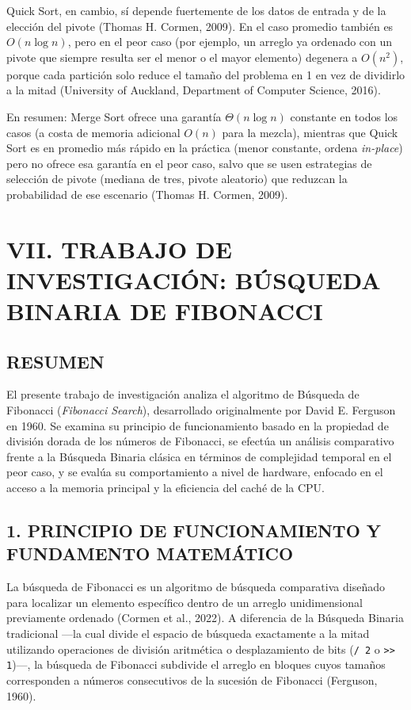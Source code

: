 \documentclass[12pt,a4paper]{article}
\begin{document}
Quick Sort, en cambio, sí depende fuertemente de los datos de entrada y de la elección del pivote
(Thomas H. Cormen, 2009). En el caso promedio también es $O(n \log n)$, pero en el peor caso (por
ejemplo, un arreglo ya ordenado con un pivote que siempre resulta ser el menor o el mayor
elemento) degenera a $O(n^2)$, porque cada partición solo reduce el tamaño del problema en 1 en
vez de dividirlo a la mitad (University of Auckland, Department of Computer Science, 2016).

En resumen: Merge Sort ofrece una garantía $\Theta(n \log n)$ constante en todos los casos (a
costa de memoria adicional $O(n)$ para la mezcla), mientras que Quick Sort es en promedio más
rápido en la práctica (menor constante, ordena \textit{in-place}) pero no ofrece esa garantía en
el peor caso, salvo que se usen estrategias de selección de pivote (mediana de tres, pivote
aleatorio) que reduzcan la probabilidad de ese escenario (Thomas H. Cormen, 2009).

\newpage
\section*{VII. TRABAJO DE INVESTIGACIÓN: BÚSQUEDA BINARIA DE FIBONACCI}

\subsection*{RESUMEN}

El presente trabajo de investigación analiza el algoritmo de Búsqueda de Fibonacci
(\textit{Fibonacci Search}), desarrollado originalmente por David E. Ferguson en 1960. Se
examina su principio de funcionamiento basado en la propiedad de división dorada de los números
de Fibonacci, se efectúa un análisis comparativo frente a la Búsqueda Binaria clásica en
términos de complejidad temporal en el peor caso, y se evalúa su comportamiento a nivel de
hardware, enfocado en el acceso a la memoria principal y la eficiencia del caché de la CPU.

\subsection*{1. PRINCIPIO DE FUNCIONAMIENTO Y FUNDAMENTO MATEMÁTICO}

La búsqueda de Fibonacci es un algoritmo de búsqueda comparativa diseñado para localizar un
elemento específico dentro de un arreglo unidimensional previamente ordenado (Cormen et al.,
2022). A diferencia de la Búsqueda Binaria tradicional ---la cual divide el espacio de búsqueda
exactamente a la mitad utilizando operaciones de división aritmética o desplazamiento de bits
(\texttt{/ 2} o \texttt{>> 1})---, la búsqueda de Fibonacci subdivide el arreglo en bloques cuyos
tamaños corresponden a números consecutivos de la sucesión de Fibonacci (Ferguson, 1960).
\end{document}
